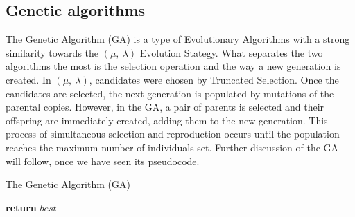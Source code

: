 \subsection{Genetic algorithms}

The Genetic Algorithm (GA) \cite{luke13metaheuristics} is a type of Evolutionary Algorithms with a strong similarity towards the $(\mu,\ \lambda)$ Evolution Stategy. What separates the two algorithms the most is the selection operation and the way a new generation is created. In $(\mu,\ \lambda)$, candidates were chosen by Truncated Selection. Once the candidates are selected, the next generation is populated by mutations of the parental copies. However, in the GA, a pair of parents is selected and their offspring are immediately created, adding them to the new generation. This process of simultaneous selection and reproduction occurs until the population reaches the maximum number of individuals set. Further discussion of the GA will follow, once we have seen its pseudocode.

\begin{algorithm}[H]
    \caption{The Genetic Algorithm (GA)}
    \begin{algorithmic}[1]
            \EndFor
                    \EndIf
                \EndFor
                 
                \EndFor
            \EndWhile
            \State \textbf{return} $best$
        \EndProcedure
    \end{algorithmic}
\end{algorithm}

